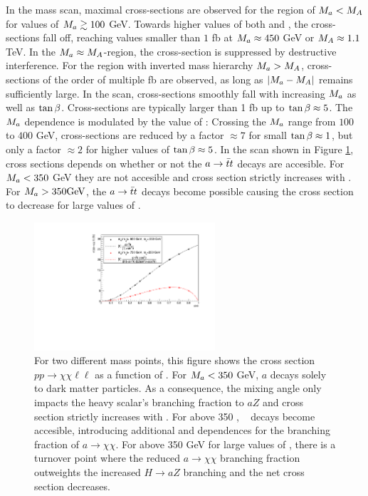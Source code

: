 In the mass scan, maximal cross-sections are observed for the region of $M_{a} < M_{A}$ for values of $M_{a}\gtrsim100$ GeV. Towards higher values of both \ma and \mA, the cross-sections fall off, reaching values smaller than $1$ fb at $M_{a}\approx450$ GeV or $M_{A}\approx1.1$ TeV. In the $M_{a}\approx M_{A}$-region, the cross-section is suppressed by destructive interference. For the region with inverted mass hierarchy $M_{a}>M_{A}$, cross-sections of the order of multiple fb are observed, as long as $|M_{a}-M_{A}|$ remains sufficiently large.
In the \tanb scan, cross-sections smoothly fall with increasing $M_{a}$ as well as $\tan\beta$. Cross-sections are typically larger than 1 fb up to $\tan\beta\approx5$. The $M_{a}$ dependence is modulated by the value of \tanb: Crossing the $M_{a}$ range from $100$ to $400$ GeV, cross-sections are reduced by a factor $\approx7$ for small $\tan\beta\approx1$, but only a factor $\approx2$ for higher values of $\tan\beta\approx5$.
In the \sinp scan shown in Figure \ref{fig:monoz_ll_sinp_scan_xsec}, cross sections depends on whether or not the $a \rightarrow \bar{t}t$ decays are accesible.  
For $M_{a} < 350$ GeV they are not accesible and cross section strictly increases with \sinp.  For $M_{a} > 350 \textrm{GeV}$, the $a \rightarrow \bar{t}t$ decays become possible causing the cross section to decrease for large values of \sinp.


\begin{figure}
\centering
\includegraphics[width=0.6\textwidth]{texinputs/04_grid/figures/monoz/leptonic/SinThetaScan_xsecs.pdf}
\caption{For two different mass points, this figure shows the cross section $pp\rightarrow\chi\chi\ell\ell$ as a function of \sinp. 
For $M_{a} < 350$ GeV, $a$ decays solely to dark matter particles.  
As a consequence, the mixing angle only impacts the heavy scalar's branching fraction to $aZ$ and 
cross section strictly increases with \sinp.  
For \ma above 350 \GeV, \ttbar~ decays become accesible, introducing additional \sinp and \cosp dependences for the branching fraction 
of $a\rightarrow\chi\chi$.  For \ma above 350 GeV for large values of \sinp, there is a turnover point where the reduced $a\rightarrow\chi\chi$ branching fraction outweights the increased $H \rightarrow aZ$ branching and the net cross section decreases.}
\label{fig:monoz_ll_sinp_scan_xsec}
\end{figure}

